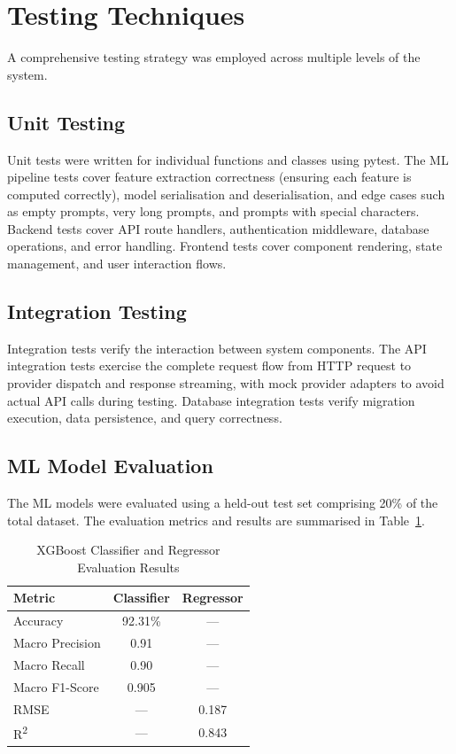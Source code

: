 \documentclass[oneside,12pt,a4paper]{report}
\begin{document}
\section{Testing Techniques}

A comprehensive testing strategy was employed across multiple levels of the system.

\subsection{Unit Testing}

Unit tests were written for individual functions and classes using pytest. The ML pipeline tests cover feature extraction correctness (ensuring each feature is computed correctly), model serialisation and deserialisation, and edge cases such as empty prompts, very long prompts, and prompts with special characters. Backend tests cover API route handlers, authentication middleware, database operations, and error handling. Frontend tests cover component rendering, state management, and user interaction flows.

\subsection{Integration Testing}

Integration tests verify the interaction between system components. The API integration tests exercise the complete request flow from HTTP request to provider dispatch and response streaming, with mock provider adapters to avoid actual API calls during testing. Database integration tests verify migration execution, data persistence, and query correctness.

\subsection{ML Model Evaluation}

The ML models were evaluated using a held-out test set comprising 20\% of the total dataset. The evaluation metrics and results are summarised in Table~\ref{tab:ml_results}.

\begin{table}[htbp]
  \centering
  \caption{XGBoost Classifier and Regressor Evaluation Results}
  \label{tab:ml_results}
  \begin{tabular}{lcc}
    \toprule
    \textbf{Metric} & \textbf{Classifier} & \textbf{Regressor} \\
    \midrule
    Accuracy & 92.31\% & --- \\
    Macro Precision & 0.91 & --- \\
    Macro Recall & 0.90 & --- \\
    Macro F1-Score & 0.905 & --- \\
    RMSE & --- & 0.187 \\
    R\textsuperscript{2} & --- & 0.843 \\
    \bottomrule
  \end{tabular}
\end{table}
\end{document}
